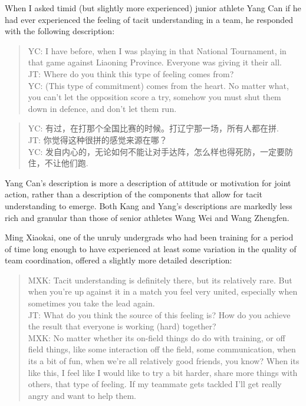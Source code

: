 \begin{CJK}{UTF8}{gbsn}
When I asked timid (but slightly more experienced) junior athlete Yang Can if he had ever experienced the feeling of tacit understanding in a team, he responded with the following description:

    \begin{quotation}
      YC: I have before, when I was playing in that National Tournament, in that game against Liaoning Province.  Everyone was giving it their all. \\
      JT: Where do you think this type of feeling comes from? \\
      YC: (This type of commitment) comes from the heart. No matter what, you can’t let the opposition score a try, somehow you must shut them down in defence, and don’t let them run.
    \end{quotation}

    \begin{quotation}
      YC: 有过，在打那个全国比赛的时候。打辽宁那一场，所有人都在拼.\\
      JT: 你觉得这种很拼的感觉来源在哪？\\
      YC: 发自内心的，无论如何不能让对手达阵，怎么样也得死防，一定要防住，不让他们跑.
    \end{quotation}

Yang Can's description is more a description of attitude or motivation for joint action, rather than a description of the components that allow for tacit understanding to emerge.  Both Kang and Yang's descriptions are markedly less rich and granular than those of senior athletes Wang Wei and Wang Zhengfen.

Ming Xiaokai, one of the unruly undergrads who had been training for a period of time long enough to have experienced at least some variation in the quality of team coordination, offered a slightly more detailed description:

    \begin{quotation}
        MXK: Tacit understanding is definitely there, but its relatively rare. But when you’re up against it in a match you feel very united, especially when sometimes you take the lead again. \\
        JT: What do you think the source of this feeling is?  How do you achieve the result that everyone is working (hard) together? \\
        MXK: No matter whether its on-field things do do with training, or off field things, like some interaction off the field, some communication, when its a bit of fun, when we're all relatively good friends, you know?  When its like this, I feel like I would like to try a bit harder, share more things with others, that type of feeling.  If my teammate gets tackled I'll get really angry and want to help them.
    \end{quotation}


\end{CJK}
